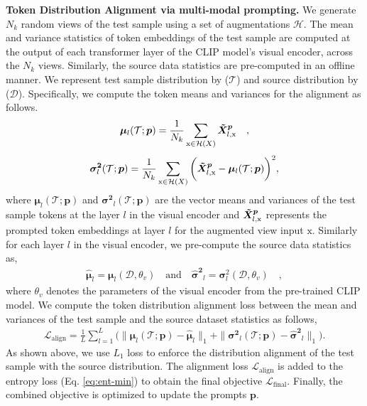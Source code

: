 \documentclass[a4paper]{article}
\begin{document}
\noindent
\textbf{Token Distribution Alignment via multi-modal prompting. }
We generate $N_k$ random views of the test sample using a set of augmentations ${\mathcal{H}}$. The mean and variance statistics of token embeddings of the test sample are computed at the output of each transformer layer of the CLIP model's visual encoder, across the $N_k$ views. Similarly, the source data statistics are pre-computed in an offline manner. We represent test sample distribution by ($\mathcal{T}$) and source distribution by ($\mathcal{D}$). Specifically, we compute the token means and variances for the alignment as follows.
\begin{align}
\label{eq:mean-prompts}
    \bm{\mu}_{l}(\mathcal{T} ; \bm{p}) = \frac{1}{N_k} \sum_{\mathrm{x} \in \mathcal{H}(X)}  \bm{\Tilde{X}^p}_{l, \mathrm{x}} \quad ,
\end{align}
\begin{align}
\label{eq:sigma-prompts}
    \bm{\sigma^2}_{l}(\mathcal{T} ; \bm{p}) = \frac{1}{N_k} \sum_{\mathrm{x} \in \mathcal{H}(X)} \bigg(\bm{\Tilde{X}^p}_{l, \mathrm{x}} - \bm{\mu}_{l}(\mathcal{T} ; \bm{p})\bigg)^2,
\end{align}
where $\bm{\mu}_{l}(\mathcal{T}; \bm{p})$ and $\bm{\sigma^2}_{l}(\mathcal{T}; \bm{p})$ are the vector means and variances of the test sample tokens at the layer $l$ in the visual encoder and $\bm{\Tilde{X}^p}_{l, \mathrm{x}}$ represents the prompted token embeddings at layer $l$ for the augmented view input $\mathrm{x}$. 
Similarly for each layer $l$  in the visual encoder, we pre-compute the source data statistics as,
\begin{align}
\label{eq:source-statistics}
 \bm{\hat{\mu}}_{l} =  \bm{\mu}_{l}(\mathcal{D}, {\theta}_v)  \quad  \text{and}\quad       \bm{\hat{\sigma}^2}_{l} =  \bm{\sigma}^2_{l}(\mathcal{D}, {\theta}_v) \quad , 
\end{align}
where ${\theta_v}$ denotes the parameters of the visual encoder from the pre-trained CLIP model. We compute the token distribution alignment loss between the mean and variances of the test sample and the source dataset statistics as follows,
\begin{align}
\label{eq:align-loss}
    \mathcal{L}_{\text{align}} = \frac{1}{L}\sum_{l=1}^{L} \bigg( \|  \bm{\mu}_{l}(\mathcal{T} ; \bm{p}) - \bm{\hat{\mu}}_{l} \|_1  +  \| \bm{\sigma^2}_{l}(\mathcal{T} ; \bm{p}) -   \bm{\hat{\sigma}^2}_{l}\|_1 \bigg).
\end{align}
As shown above, we use ${L}_1$ loss to enforce the distribution alignment of the test sample with the source distribution. The alignment loss $\mathcal{L}_{\text{align}}$ is  added to the entropy loss (Eq. \ref{eq:ent-min}) to obtain the final objective $\mathcal{L}_{\text{final}}$. Finally, the combined objective  is optimized to update the prompts $\bm{p}$.
\end{document}
